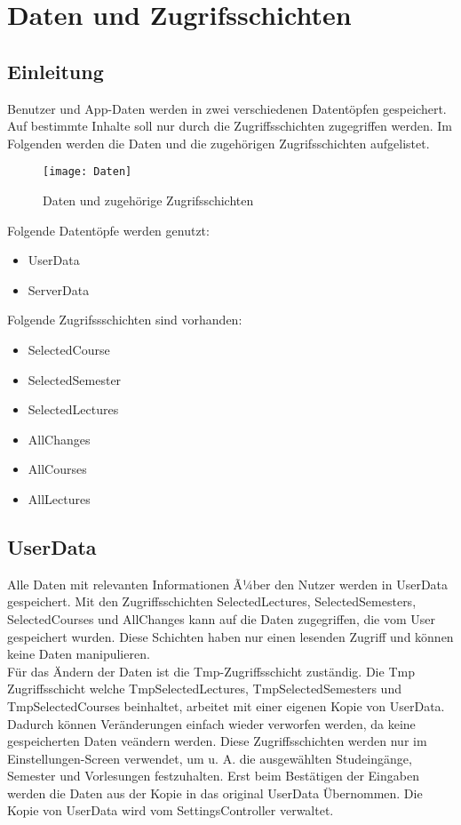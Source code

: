 \chapter{Daten und Zugrifsschichten}
\section{Einleitung}
Benutzer und App-Daten werden in zwei verschiedenen Datentöpfen gespeichert. Auf bestimmte Inhalte soll nur durch die Zugriffsschichten zugegriffen werden. Im Folgenden werden die Daten und die zugehörigen Zugrifsschichten aufgelistet.\\

\begin{figure}[htb]
    \centering
    \texttt{[image: Daten]}
    \caption{Daten und zugehörige Zugrifsschichten}
\end{figure}

Folgende Datentöpfe werden genutzt:
\begin{itemize}
     \item UserData
     \item ServerData \\
\end{itemize}

Folgende Zugrifssschichten sind vorhanden:
\begin{itemize}
     \item SelectedCourse
     \item SelectedSemester
     \item SelectedLectures
     \item AllChanges
     \item AllCourses
     \item AllLectures
\end{itemize}

\newpage
\section{UserData}
Alle Daten mit relevanten Informationen Ã¼ber den Nutzer werden in UserData gespeichert. Mit den Zugriffsschichten SelectedLectures, SelectedSemesters, SelectedCourses und AllChanges kann auf die Daten zugegriffen, die vom User gespeichert wurden. Diese Schichten haben nur einen lesenden Zugriff und können keine Daten manipulieren. \\

Für das Ändern der Daten ist die Tmp-Zugriffsschicht zuständig. Die Tmp Zugriffsschicht welche TmpSelectedLectures, TmpSelectedSemesters und TmpSelectedCourses beinhaltet, arbeitet mit einer eigenen Kopie von UserData. Dadurch können Veränderungen einfach wieder verworfen werden, da keine gespeicherten Daten veändern werden. Diese Zugriffsschichten werden nur im Einstellungen-Screen verwendet, um u. A. die ausgewählten Studeingänge, Semester und Vorlesungen festzuhalten. Erst beim Bestätigen der Eingaben werden die Daten aus der Kopie in das original UserData Übernommen. Die Kopie von UserData wird vom SettingsController verwaltet.\\

